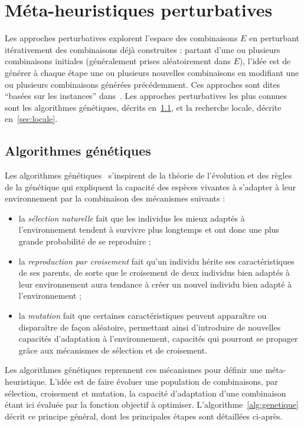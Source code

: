 \documentclass[12pt,a4paper]{book}
\begin{document}
\section{Méta-heuristiques perturbatives}
\label{sec:perturbatives}

Les approches perturbatives explorent l'espace des combinaisons $E$ en perturbant itérativement des combinaisons déjà construites : partant d'une ou plusieurs combinaisons initiales (généralement prises aléatoirement dans $E$), l'idée est de générer à chaque étape une ou plusieurs nouvelles combinaisons en modifiant une ou plusieurs combinaisons générées précédemment. Ces approches sont dites ``basées sur les instances'' dans~\cite{zlochin2004}. Les approches perturbatives les plus connues sont les algorithmes génétiques, décrits en~\ref{sec:genetiques}, et la recherche locale, décrite en~\ref{sec:locale}.

\subsection{Algorithmes génétiques}
\label{sec:genetiques}

Les algorithmes génétiques~\cite{holland1975,goldberg1989,eiben2003} s'inspirent de la théorie de l'évolution et des règles de la génétique qui expliquent la capacité des espèces vivantes à s'adapter à leur environnement par la combinaison des mécanismes suivants :
\begin{itemize}
  \item la \textit{sélection naturelle} fait que les individus les mieux adaptés à l'environnement tendent à survivre plus longtemps et ont donc une plus grande probabilité de se reproduire ;
  \item la \textit{reproduction par croisement} fait qu'un individu hérite ses caractéristiques de ses parents, de sorte que le croisement de deux individus bien adaptés à leur environnement aura tendance à créer un nouvel individu bien adapté à l'environnement ;
  \item la \textit{mutation} fait que certaines caractéristiques peuvent apparaître ou disparaître de façon aléatoire, permettant ainsi d'introduire de nouvelles capacités d'adaptation à l'environnement, capacités qui pourront se propager grâce aux mécanismes de sélection et de croisement.
\end{itemize}

Les algorithmes génétiques reprennent ces mécanismes pour définir une méta-heuristique. L'idée est de faire évoluer une population de combinaisons, par sélection, croisement et mutation, la capacité d'adaptation d'une combinaison étant ici évaluée par la fonction objectif à optimiser. L'algorithme~\ref{alg:genetique} décrit ce principe général, dont les principales étapes sont détaillées ci-après.
\end{document}
